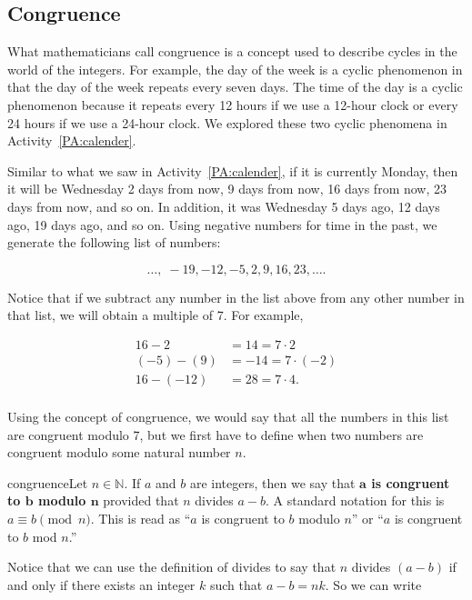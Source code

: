 \subsection*{Congruence}
%
What mathematicians call congruence is a concept used to describe cycles in the world of the integers. For example, the day of the week is a cyclic phenomenon in that the day of the week repeats every seven days.  The time of the day is a cyclic phenomenon because it repeats every 12 hours if we use a 12-hour clock  or every 24 hours if we use a 24-hour clock.  We explored these two cyclic phenomena in \typeu Activity~\ref*{PA:calender}.

Similar to what we saw in \typeu Activity~\ref*{PA:calender}, if it is currently Monday, then it will be Wednesday 2 days from now, 9 days from now, 16 days from now, 23 days from now, and so on.  In addition, it was Wednesday 5 days ago, 12 days ago, 19 days ago, and so on.  Using negative numbers for time in the past, we generate the following list of numbers:

\[
 \ldots ,\; - 19,  - 12,  - 5, 2, 9, 16, 23,  \ldots .
\]

Notice that if we subtract any number in the list above from any other number in that list, we will obtain a multiple of 7.  For example,

\[
\begin{aligned}
  16 - 2 &= 14 = 7 \cdot 2 \\ 
  \left( { - 5} \right) - \left( 9 \right) &=  - 14 = 7 \cdot \left( { - 2} \right) \\ 
  16 - \left( { - 12} \right) &= 28 = 7 \cdot 4. \\ 
\end{aligned} 
\]

Using the concept of congruence, we would say that all the numbers in this list are congruent modulo 7, but we first have to define when two numbers are congruent modulo some natural number  $n$.

\begin{defbox}{congruence}{Let  $n \in \mathbb{N}$.  If  $a$  and  $b$  are integers, then we say that \textbf{$\boldsymbol{a}$  is congruent to  $\boldsymbol{b}$  modulo  $\boldsymbol{n}$}
%
  provided that  $n$  divides  $a - b$.  A standard notation for this is   
$a \equiv b \pmod n$.
\label{sym:congruence}%
  This is read as ``$a$  is congruent to  $b$  modulo  $n$''   or  ``$a$  is congruent to  $b$  mod  $n$.''}
\end{defbox}
%
\noindent
Notice that we can use the definition of divides to say that  $n$ divides $(a - b)$  if and only if  there exists an integer  $k$  such that  $a - b = nk$.  So we can write

